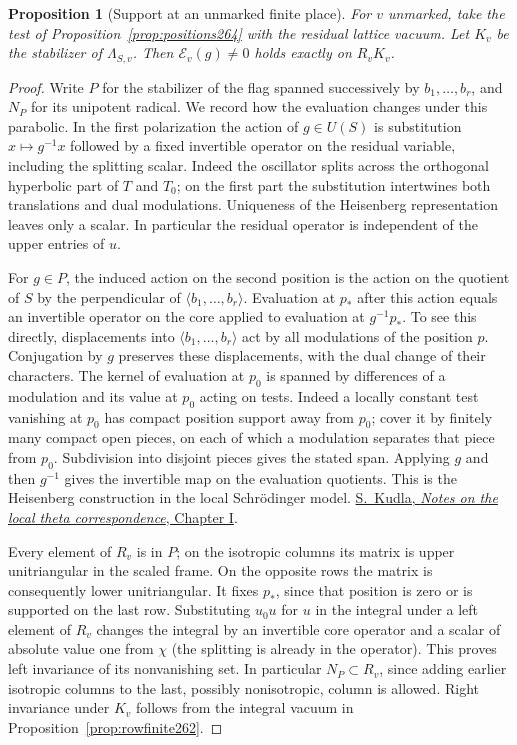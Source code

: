 \documentclass[a4paper,11pt]{article}
\newtheorem{proposition}{Proposition}[section]
\theoremstyle{definition}
\theoremstyle{remark}
\numberwithin{equation}{section}
\begin{document}
\begin{proposition}[Support at an unmarked finite place]\leavevmode
\label{prop:flagunmarked264}
For \(v\) unmarked, take the test of
Proposition~\ref{prop:positions264} with the residual lattice
vacuum. Let \(K_v\) be the stabilizer of \(\Lambda_{S,v}\).
Then \(\mathcal E_v(g)\ne0\) holds exactly on \(R_vK_v\).
\end{proposition}
\begin{proof}
Write \(P\) for the stabilizer of the flag spanned successively
by \(b_1,\ldots,b_r\), and \(N_P\) for its unipotent radical.
We record how the evaluation changes under this parabolic.
In the first polarization the action of \(g\in U(S)\) is
substitution \(x\mapsto g^{-1}x\) followed by a fixed invertible
operator on the residual variable, including the splitting
scalar. Indeed the oscillator splits across the orthogonal
hyperbolic part of \(T\) and \(T_0\); on the first part the
substitution intertwines both translations and dual modulations.
Uniqueness of the Heisenberg representation leaves only a
scalar. In particular the residual operator is independent of
the upper entries of \(u\).

For \(g\in P\), the induced action on the second position is
the action on the quotient of \(S\) by the perpendicular of
\(\langle b_1,\ldots,b_r\rangle\). Evaluation at \(p_*\)
after this action equals an invertible operator on the core
applied to evaluation at \(g^{-1}p_*\). To see this directly,
displacements into \(\langle b_1,\ldots,b_r\rangle\) act by
all modulations of the position \(p\). Conjugation by \(g\)
preserves these displacements, with the dual change of their
characters. The kernel of evaluation at \(p_0\) is spanned by
differences of a modulation and its value at \(p_0\) acting
on tests. Indeed a locally constant test vanishing at \(p_0\)
has compact position support away from \(p_0\); cover it by
finitely many compact open pieces, on each of which a
modulation separates that piece from \(p_0\). Subdivision
into disjoint pieces gives the stated span. Applying \(g\)
and then \(g^{-1}\) gives the invertible map on the evaluation
quotients. This is the Heisenberg construction in the local
Schr\"odinger model.
\href{https://www.math.toronto.edu/~skudla/castle.pdf}{S.~Kudla,
\emph{Notes on the local theta correspondence}, Chapter I}.

Every element of \(R_v\) is in \(P\); on the isotropic columns
its matrix is upper unitriangular in the scaled frame.
On the opposite rows the matrix is consequently lower
unitriangular. It fixes \(p_*\), since that position is zero
or is supported on the last row. Substituting \(u_0u\) for
\(u\) in the integral under a left element of \(R_v\) changes
the integral by an invertible core operator and a scalar of
absolute value one from \(\chi\) (the splitting is already in
the operator). This proves left invariance of its nonvanishing
set. In particular \(N_P\subset R_v\), since adding earlier
isotropic columns to the last, possibly nonisotropic, column
is allowed. Right invariance under \(K_v\) follows from the
integral vacuum in Proposition~\ref{prop:rowfinite262}.


\end{proof}
\end{document}
